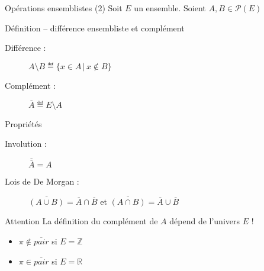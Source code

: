 
\begingroup
\begin{frame}{Opérations ensemblistes (2)}
  Soit $E$ un ensemble. Soient $A, B \in \mathscr{P}(E)$
  \begin{block}{Définition -- différence ensembliste et complément}
    \begin{description}
    \item[Différence :] $A \setminus B \eqdef \{x \in A \,|\, x \notin B\}$
    \item[Complément :] $\overline{A} \eqdef E \setminus A$
    \end{description}
  \end{block}
  \begin{block}{Propriétés}
    \begin{description}
    \item[Involution :] \alert{$\overline{\overline{A}} = A$}
    \item[Lois de De Morgan :] \alert{$\overline{(A \cup B)} = \overline{A} \cap \overline{B}$} et \alert{$\overline{(A \cap B)} = \overline{A} \cup \overline{B}$}
    \end{description}
  \end{block}
  \begin{alertblock}{Attention}
    La définition du complément de $A$ dépend de l'univers $E$ !
    \begin{itemize}
    \item $\pi \notin \overline{\mathit{pair}}$ si $E = \mathbb{Z}$
    \item $\pi \in \overline{\mathit{pair}}$ si $E = \mathbb{R}$
    \end{itemize}
  \end{alertblock}
\end{frame}
\endgroup
